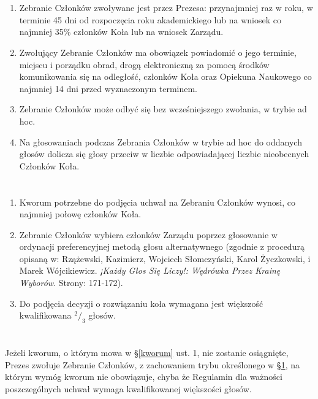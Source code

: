 \section{}
\label{Tryb}
\begin{enumerate}
\item Zebranie Członków zwoływane jest przez Prezesa: przynajmniej raz w roku, w terminie 45 dni od rozpoczęcia roku akademickiego lub na wniosek co najmniej 35\% członków Koła lub na wniosek Zarządu.
\item Zwołujący Zebranie Członków ma obowiązek powiadomić o jego terminie, miejscu i porządku obrad, drogą elektroniczną za pomocą środków komunikowania się na odległość, członków Koła oraz Opiekuna Naukowego co najmniej 14 dni przed wyznaczonym terminem.
\item Zebranie Członków może odbyć się bez wcześniejszego zwołania, w trybie ad hoc.
\item Na głosowaniach podczas Zebrania Członków w trybie ad hoc do oddanych głosów dolicza się głosy przeciw w liczbie odpowiadającej liczbie nieobecnych Członków Koła.
\end{enumerate}

\section{}
\begin{enumerate}
\label{kworum}
\item Kworum potrzebne do podjęcia uchwał na Zebraniu Członków wynosi, co najmniej połowę członków Koła.
\item Zebranie Członków wybiera członków Zarządu poprzez głosowanie w ordynacji preferencyjnej metodą głosu alternatywnego (zgodnie z procedurą opisaną w: Rzążewski, Kazimierz, Wojciech Słomczyński, Karol Życzkowski, i Marek Wójcikiewicz. \textit{¡Każdy Głos Się Liczy!: Wędrówka Przez Krainę Wyborów}. Strony: 171-172).
\item Do podjęcia decyzji o rozwiązaniu koła wymagana jest większość kwalifikowana $^2/_3$ głosów.
\end{enumerate}

\section{}
Jeżeli kworum, o którym mowa w \S \ref{kworum} ust. 1, nie zostanie osiągnięte, Prezes zwołuje Zebranie Członków, z zachowaniem trybu określonego w \S \ref{Tryb}, na którym wymóg kworum nie obowiązuje, chyba że Regulamin dla ważności poszczególnych uchwał wymaga kwalifikowanej większości głosów. 


